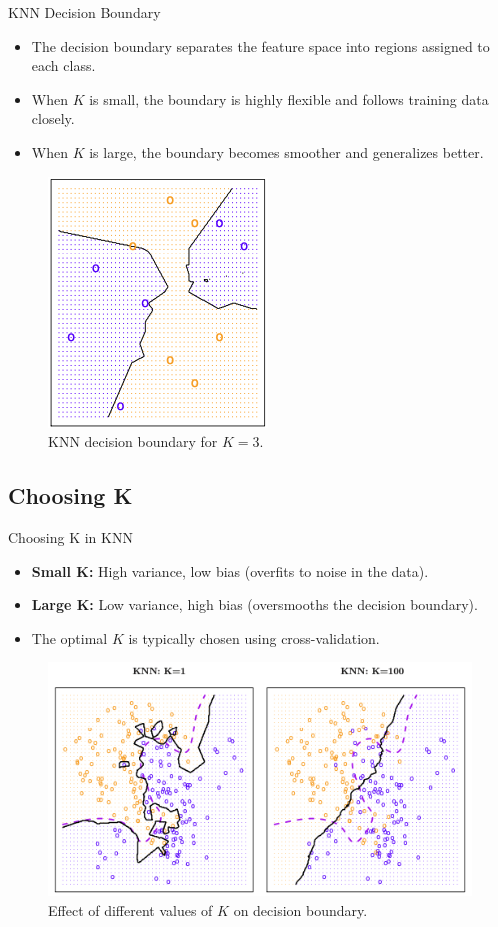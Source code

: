 \documentclass[aspectratio=169,xcolor=dvipsnames]{beamer}
\begin{document}
\begin{frame}{KNN Decision Boundary}
    \begin{itemize}
        \item The decision boundary separates the feature space into regions assigned to each class.
        \item When \( K \) is small, the boundary is highly flexible and follows training data closely.
        \item When \( K \) is large, the boundary becomes smoother and generalizes better.
    \end{itemize}
    \begin{figure}
        \centering
       \includegraphics[width=0.3\linewidth]{images/classifier.png}
        \caption{KNN decision boundary for \( K = 3 \).}
    \end{figure}
\end{frame}

\subsection{Choosing K}
\begin{frame}{Choosing K in KNN}
    \begin{itemize}
        \item \textbf{Small K:} High variance, low bias (overfits to noise in the data).
        \item \textbf{Large K:} Low variance, high bias (oversmooths the decision boundary).
        \item The optimal \( K \) is typically chosen using cross-validation.
    \end{itemize}
    \begin{figure}
        \centering
        \includegraphics[width=0.6\linewidth]{images/boundary.png}
        \caption{Effect of different values of \( K \) on decision boundary.}
    \end{figure}
\end{frame}
\end{document}
